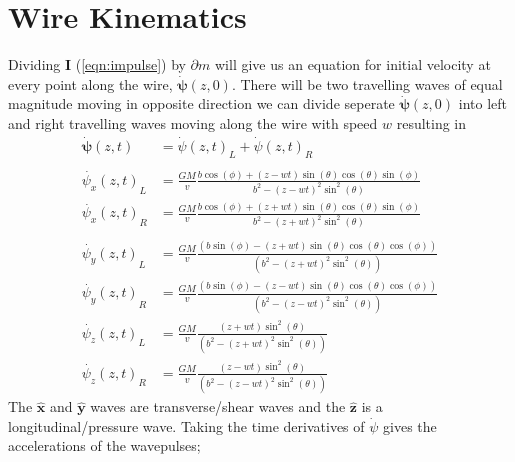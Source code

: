 \documentclass{report}
\begin{document}
\section*{Wire Kinematics}
Dividing $\mathbf{I}$ (\ref{eqn:impulse}) by $\partial m$ will give us an equation for initial velocity at every point along the wire, $\mathbf{\dot\psi} (z, 0)$. 
There will be two travelling waves of equal magnitude moving in opposite direction we can divide seperate $\mathbf{\dot\psi}(z,0)$ into left and right travelling waves moving along the wire with speed $w$ resulting in
\begin{align}
    \mathbf{\dot{\psi}} (z, t) &= {\dot{\psi} (z, t)}_L + {\dot{\psi} (z, t)}_R\\
    \label{eqn:velocity pulse}
    \nonumber\\
    \nonumber {\dot{\psi_x} (z, t)}_L &= \frac{G M}{v} \frac{b \cos (\phi )+ (z - w t) \sin (\theta ) \cos (\theta ) \sin (\phi )}{b^2-{(z - w t)}^2 \sin ^2(\theta )}\\
    \nonumber {\dot{\psi_x} (z, t)}_R &= \frac{G M}{v} \frac{b \cos (\phi )+ (z + w t) \sin (\theta ) \cos (\theta ) \sin (\phi )}{b^2-{(z + w t)}^2 \sin ^2(\theta )}\\
    \nonumber\\
    \nonumber {\dot{\psi_y} (z, t)}_L &= \frac{G M}{v} \frac{(b \sin (\phi )-{(z + w t)} \sin (\theta ) \cos (\theta ) \cos (\phi ))}{\left(b^2-{(z + w t)}^2 \sin ^2(\theta )\right)}\\
    \nonumber {\dot{\psi_y} (z, t)}_R &= \frac{G M}{v} \frac{(b \sin (\phi )-{(z - w t)} \sin (\theta ) \cos (\theta ) \cos (\phi ))}{\left(b^2-{(z - w t)}^2 \sin ^2(\theta )\right)}
    \nonumber\\
    \nonumber {\dot{\psi_z} (z, t)}_L &= \frac{G M}{v} \frac{{(z + w t)} \sin ^2(\theta )}{\left(b^2-{(z + w t)}^2 \sin ^2(\theta )\right)}\\
    \nonumber {\dot{\psi_z} (z, t)}_R &= \frac{G M}{v} \frac{{(z - w t)} \sin ^2(\theta )}{\left(b^2-{(z - w t)}^2 \sin ^2(\theta )\right)}
\end{align}
The $\mathbf{\hat x}$ and $\mathbf{\hat y}$ waves are transverse/shear waves and the $\mathbf{\hat z}$ is a longitudinal/pressure wave.
Taking the time derivatives of $\dot{\psi}$ gives the accelerations of the wavepulses;
\end{document}
